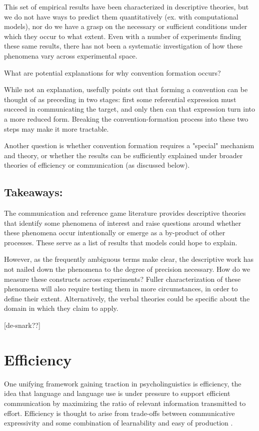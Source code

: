 \documentclass[]{article}
\begin{document}
This set of empirical results have been characterized in descriptive theories, but we do not have ways to predict them quantitatively (ex. with computational models), nor do we have a grasp on the necessary or sufficient conditions under which they occur to what extent. Even with a number of experiments finding these same results, there has not been a systematic investigation of how these phenomena vary across experimental space. 

What are potential explanations for why convention formation occurs?

While not an explanation, \cite{leung2023} usefully points out that forming a convention can be thought of as preceding in two stages: first some referential expression must succeed in communicating the target, and only then can that expression turn into a more reduced form. Breaking the convention-formation process into these two steps may make it more tractable. 

Another question is whether convention formation requires a "special" mechanism and theory, or whether the results can be sufficiently explained under broader theories of efficiency or communication (as discussed below). 


\subsection{Takeaways:} The communication and reference game literature provides descriptive theories that identify some phenomena of interest and raise questions around whether these phenomena occur intentionally or emerge as a by-product of other processes. These serve as a list of results that models could hope to explain. 

However, as the frequently ambiguous terms make clear, the descriptive work has not nailed down the phenomena to the degree of precision necessary. How do we measure these constructs across experiments? Fuller characterization of these phenomena will also require testing them in more circumstances, in order to define their extent. Alternatively, the verbal theories could be specific about the domain in which they claim to apply.  

[de-snark??]




\section{Efficiency}
One unifying framework gaining traction in psycholinguistics is efficiency, the idea that language and language use is under pressure to support efficient communication by maximizing the ratio of relevant information transmitted to effort. Efficiency is thought to arise from trade-offs between communicative expressivity and some combination of learnability and easy of production \cite{piantadosi2012, kirby2015}. 
\end{document}

